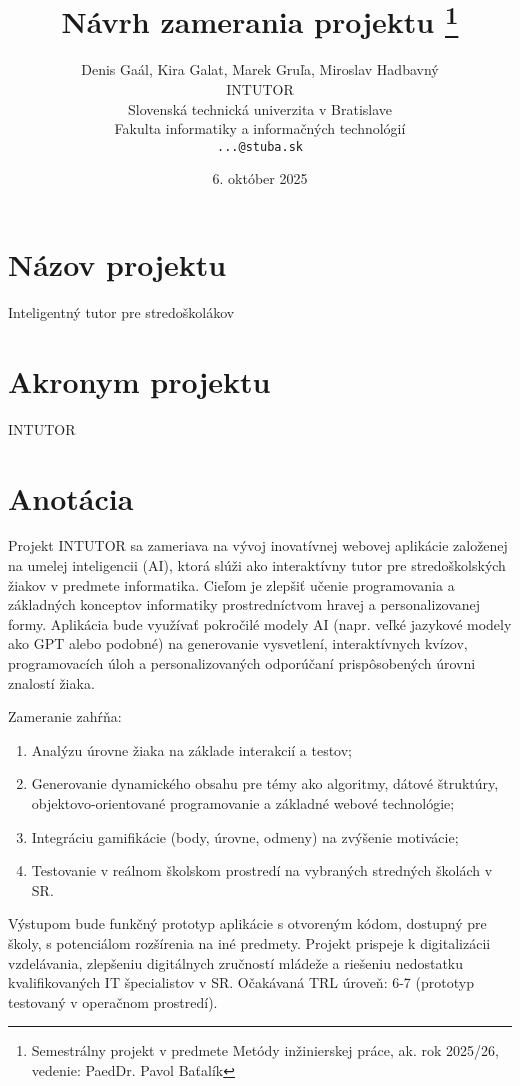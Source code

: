 \documentclass[10pt,twoside,slovak,a4paper]{article}
\title{Návrh zamerania projektu
\thanks{Semestrálny projekt v predmete Metódy inžinierskej práce, ak. rok 2025/26, vedenie: PaedDr. Pavol Baťalík}}
\author{Denis Gaál, Kira Galat, Marek Gruľa, Miroslav Hadbavný\\[2pt]
	{\small INTUTOR}\\
	{\small Slovenská technická univerzita v Bratislave}\\
	{\small Fakulta informatiky a informačných technológií}\\
	{\small \texttt{...@stuba.sk}}
	}
\date{\small 6. október 2025} %
\begin{document}
\maketitle

\section{Názov projektu}
Inteligentný tutor pre stredoškolákov

\section{Akronym projektu}
INTUTOR

\section{Anotácia}
Projekt INTUTOR sa zameriava na vývoj inovatívnej webovej aplikácie založenej na umelej inteligencii (AI), ktorá slúži ako interaktívny tutor pre stredoškolských žiakov v predmete informatika. Cieľom je zlepšiť učenie programovania a základných konceptov informatiky prostredníctvom hravej a personalizovanej formy. Aplikácia bude využívať pokročilé modely AI (napr. veľké jazykové modely ako GPT alebo podobné) na generovanie vysvetlení, interaktívnych kvízov, programovacích úloh a personalizovaných odporúčaní prispôsobených úrovni znalostí žiaka. 

Zameranie zahŕňa: 
\begin{enumerate}
    \item Analýzu úrovne žiaka na základe interakcií a testov; 
    \item Generovanie dynamického obsahu pre témy ako algoritmy, dátové štruktúry, objektovo-orientované programovanie a základné webové technológie; 
    \item Integráciu gamifikácie (body, úrovne, odmeny) na zvýšenie motivácie; 
    \item Testovanie v reálnom školskom prostredí na vybraných stredných školách v SR. 
\end{enumerate}

Výstupom bude funkčný prototyp aplikácie s otvoreným kódom, dostupný pre školy, s potenciálom rozšírenia na iné predmety. Projekt prispeje k digitalizácii vzdelávania, zlepšeniu digitálnych zručností mládeže a riešeniu nedostatku kvalifikovaných IT špecialistov v SR. Očakávaná TRL úroveň: 6-7 (prototyp testovaný v operačnom prostredí).
\end{document}
